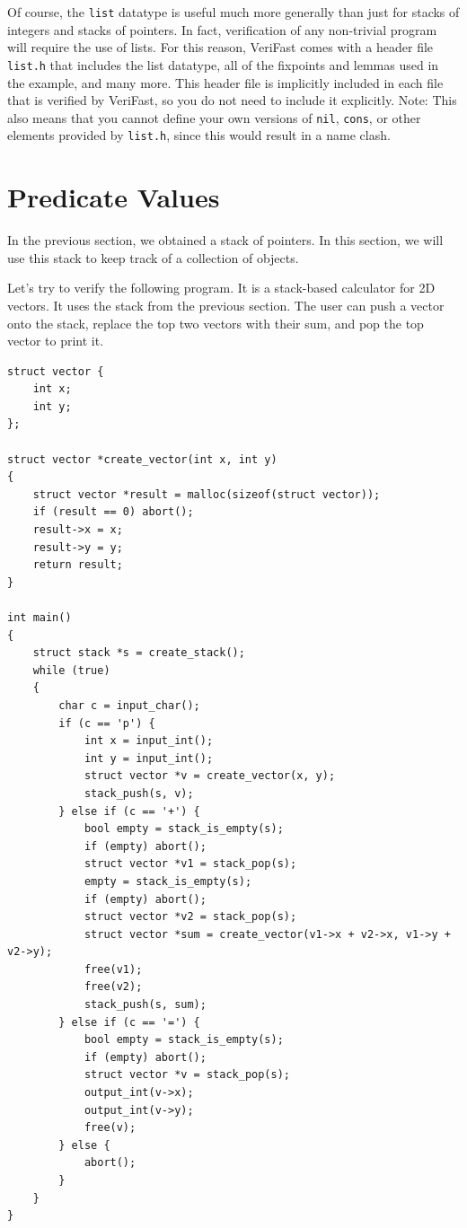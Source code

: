 \documentclass{article}
\begin{document}
Of course, the \lstinline!list! datatype is useful much more
generally than just for stacks of integers and stacks of
pointers. In fact, verification of any non-trivial program will
require the use of lists. For this reason, VeriFast comes with
a header file \verb|list.h| that includes the list datatype,
all of the fixpoints and lemmas used in the example, and many
more. This header file is implicitly included in each file that
is verified by VeriFast, so you do not need to include it
explicitly. Note: This also means that you cannot define your
own versions of \lstinline!nil!, \lstinline!cons!, or other
elements provided by \verb|list.h|, since this would result in
a name clash.

\section{Predicate Values}\label{section:predvals}

In the previous section, we obtained a stack of pointers. In
this section, we will use this stack to keep track of a
collection of objects.

Let's try to verify the following program. It is a stack-based
calculator for 2D vectors. It uses the stack from the previous
section. The user can push a vector onto the stack, replace the
top two vectors with their sum, and pop the top vector to print
it.

\begin{lstlisting}
struct vector {
    int x;
    int y;
};

struct vector *create_vector(int x, int y)
{
    struct vector *result = malloc(sizeof(struct vector));
    if (result == 0) abort();
    result->x = x;
    result->y = y;
    return result;
}

int main()
{
    struct stack *s = create_stack();
    while (true)
    {
        char c = input_char();
        if (c == 'p') {
            int x = input_int();
            int y = input_int();
            struct vector *v = create_vector(x, y);
            stack_push(s, v);
        } else if (c == '+') {
            bool empty = stack_is_empty(s);
            if (empty) abort();
            struct vector *v1 = stack_pop(s);
            empty = stack_is_empty(s);
            if (empty) abort();
            struct vector *v2 = stack_pop(s);
            struct vector *sum = create_vector(v1->x + v2->x, v1->y + v2->y);
            free(v1);
            free(v2);
            stack_push(s, sum);
        } else if (c == '=') {
            bool empty = stack_is_empty(s);
            if (empty) abort();
            struct vector *v = stack_pop(s);
            output_int(v->x);
            output_int(v->y);
            free(v);
        } else {
            abort();
        }
    }
}
\end{lstlisting}
\end{document}
